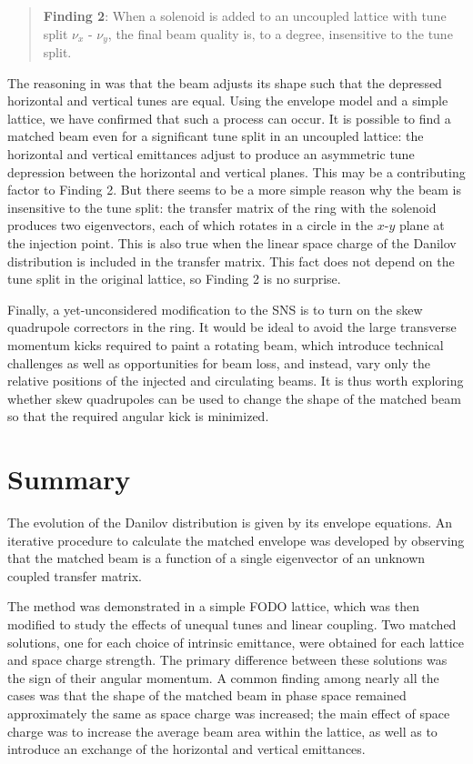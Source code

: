 %
\begin{quote}
    \textbf{Finding 2}: When a solenoid is added to an uncoupled lattice with tune split $\nu_x$ - $\nu_y$, the final beam quality is, to a degree, insensitive to the tune split. 
\end{quote}
%
The reasoning in \cite{Holmes2018} was that the beam adjusts its shape such that the depressed horizontal and vertical tunes are equal. Using the envelope model and a simple lattice, we have confirmed that such a process can occur. It is possible to find a matched beam even for a significant tune split in an uncoupled lattice: the horizontal and vertical emittances adjust to produce an asymmetric tune depression between the horizontal and vertical planes. This may be a contributing factor to Finding 2. But there seems to be a more simple reason why the beam is insensitive to the tune split: the transfer matrix of the ring with the solenoid produces two eigenvectors, each of which rotates in a circle in the $x$-$y$ plane at the injection point. This is also true when the linear space charge of the Danilov distribution is included in the transfer matrix. This fact does not depend on the tune split in the original lattice, so Finding 2 is no surprise.

Finally, a yet-unconsidered modification to the SNS is to turn on the skew quadrupole correctors in the ring. It would be ideal to avoid the large transverse momentum kicks required to paint a rotating beam, which introduce technical challenges as well as opportunities for beam loss, and instead, vary only the relative positions of the injected and circulating beams. It is thus worth exploring whether skew quadrupoles can be used to change the shape of the matched beam so that the required angular kick is minimized.



\section{Summary}

The evolution of the Danilov distribution is given by its envelope equations. An iterative procedure to calculate the matched envelope was developed by observing that the matched beam is a function of a single eigenvector of an unknown coupled transfer matrix. 

The method was demonstrated in a simple FODO lattice, which was then modified to study the effects of unequal tunes and linear coupling. Two matched solutions, one for each choice of intrinsic emittance, were obtained for each lattice and space charge strength. The primary difference between these solutions was the sign of their angular momentum. A common finding among nearly all the cases was that the shape of the matched beam in phase space remained approximately the same as space charge was increased; the main effect of space charge was to increase the average beam area within the lattice, as well as to introduce an exchange of the horizontal and vertical emittances.

